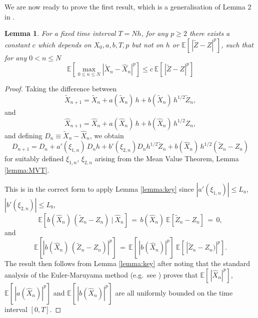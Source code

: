 \documentclass[11pt]{article}
\def \EE {{\mathbb{E}}}
\def \tZ {{\widetilde{Z}}}
\def \tXn {{\widetilde{X}_n}}
\def \tXnp {{\widetilde{X}_{n+1}}}
\def \hXn {{\widehat{X}_n}}
\def \hXnp {{\widehat{X}_{n+1}}}
\newtheorem{lemma}[theorem]{Lemma}
\begin{document}

We are now ready to prove the first result, which is a generalisation 
of Lemma 2 in \cite{ghmr19}.

\begin{lemma}
\label{lemma:first_diff}
For a fixed time interval $T\!=\!N h$, for any $p\!\geq\!2$ there exists a 
constant $c$ which depends on $X_0, a, b, T, p$ but not on $h$ or 
$\EE[\, |\tZ{-}Z|^p]$, such that for any $0\!<\!n\!\leq\!N$
\[
\EE\left[ \max_{0\leq n\leq N}|\tXn{-}\hXn|^p\right] 
\leq c\ \EE[\, |\tZ{-}Z|^p]
\]
\end{lemma}
\begin{proof}
Taking the difference between 
\begin{equation}
  \tXnp = \tXn + a(\tXn)\, h + b(\tXn)\, h^{1/2} \tZ_n,
  \label{eq:original}
\end{equation}
and
\begin{equation}
  \hXnp = \hXn + a(\hXn)\, h + b(\hXn)\, h^{1/2} Z_n,
  \label{eq:approx}
\end{equation}
and defining $D_n \equiv \tXn {-} \hXn$, we obtain
\begin{equation}
D_{n+1} = D_n + a'(\xi_{1,n})\, D_n h + b'(\xi_{2,n}) D_n h^{1/2} \tZ_n
                                 + b(\hXn) \, h^{1/2} (\tZ_n{-}Z_n)
\label{eq:diff}
\end{equation}
for suitably defined $\xi_{1,n}$, $\xi_{2,n}$ arising from the Mean Value Theorem,
Lemma \ref{lemma:MVT}.

This is in the correct form to apply Lemma \ref{lemma:key} since
$|a'(\xi_{1,n})| \leq L_a$, ~
$|b'(\xi_{2,n})| \leq L_b$,
\[
\EE\left[b(\hXn) \, (\tZ_n{-}Z_n)\ |\ \hXn\right] \, =\, b(\hXn) \ \EE[\tZ_n{-}Z_n]\, =\, 0,
\]
and
\[
\EE\left[ |b(\hXn) \, (\tZ_n{-}Z_n)|^p \right]
\, =\, \EE[\, |b(\hXn)|^p] \ \EE[\,|\tZ_n{-}Z_n)|^p ].
\]
The result then follows from Lemma \ref{lemma:key} after noting that
the standard analysis of the Euler-Maruyama method (e.g.\ see \cite{kp92})
proves that $\EE[\, |\hXn|^p]$, $\EE[\, |a(\hXn)|^p]$ and $\EE[\, |b(\hXn)|^p]$ 
are all uniformly bounded on the time interval $[0,T]$.
\end{proof}
\end{document}
